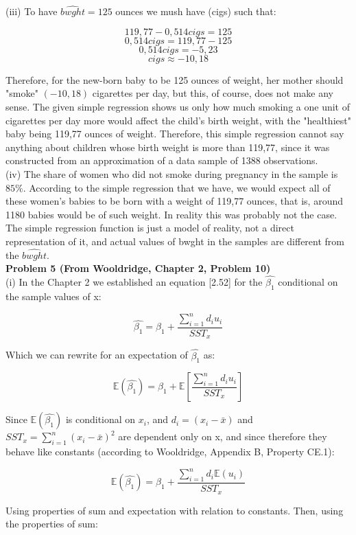 \documentclass{article}
\begin{document}
(iii) To have $\widehat{bwght} = 125$ ounces we mush have (cigs) such that:

$$119,77 - 0,514cigs = 125$$
$$0,514cigs = 119,77 - 125$$
$$0,514cigs = -5,23$$
$$cigs \approx -10,18$$

Therefore, for the new-born baby to be 125 ounces of weight, her mother should "smoke" $(-10,18)$ cigarettes per day, but this, of course, does not make any sense. The given simple regression shows us only how much smoking a one unit of cigarettes per day more would affect the child's birth weight, with the "healthiest" baby being 119,77 ounces of weight. Therefore, this simple regression cannot say anything about children whose birth weight is more than 119,77, since it was constructed from an approximation of a data sample of 1388 observations. 
\\

(iv) The share of women who did not smoke during pregnancy in the sample is $85\%$. According to the simple regression that we have, we would expect all of these women's babies to be born with a weight of 119,77 ounces, that is, around 1180 babies would be of such weight. In reality this was probably not the case. The simple regression function is just a model of reality, not a direct representation of it, and actual values of bwght in the samples are different from the  $\widehat{bwght}$. 
\\

\textbf{Problem 5 (From Wooldridge, Chapter 2, Problem 10)}
\\

(i) In the Chapter 2 we established an equation [2.52] for the $\hat{\beta_1}$ conditional on the sample values of x:

$$\hat{\beta_1} = \beta_1 + \frac{\sum_{i=1}^{n} d_i u_i}{SST_x}$$

Which we can rewrite for an expectation of $\hat{\beta_1}$ as:

$$\mathbb{E}(\hat{\beta_1}) = \beta_1 + \mathbb{E}[\frac{\sum_{i=1}^{n} d_i u_i}{SST_x}]$$

Since $\mathbb{E}(\hat{\beta_1})$ is conditional on $x_i$, and $d_i = (x_i - \bar{x})$ and $SST_x = \sum_{i=1}^{n} (x_i - \bar{x})^2$ are dependent only on x, and since therefore they behave like constants (according to Wooldridge, Appendix B, Property CE.1):

$$\mathbb{E}(\hat{\beta_1}) = \beta_1 + \frac{\sum_{i=1}^{n} d_i \mathbb{E}(u_i)}{SST_x}$$

Using properties of sum and expectation with relation to constants. Then, using the properties of sum:
\end{document}
